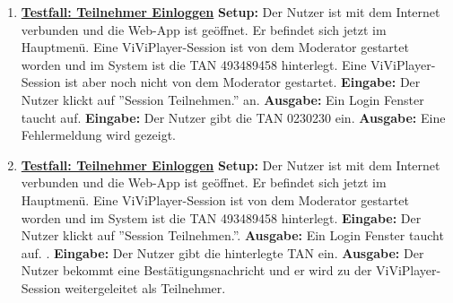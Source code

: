 \begin{enumerate}
	
	\item \underline{\textbf{Testfall: Teilnehmer Einloggen}} \linebreak
	\textbf{Setup:} Der Nutzer ist mit dem Internet verbunden und die Web-App ist geöffnet. Er befindet sich jetzt im Hauptmenü. Eine ViViPlayer-Session ist von dem Moderator gestartet worden und im System ist die TAN 493489458 hinterlegt.
	Eine ViViPlayer-Session ist aber noch nicht von dem Moderator gestartet. \linebreak
	\textbf{Eingabe:} Der Nutzer klickt auf ''Session Teilnehmen.'' an. \linebreak
	\textbf{Ausgabe:} Ein Login Fenster taucht auf.\linebreak
	\textbf{Eingabe:} Der Nutzer gibt die TAN 0230230 ein. \linebreak
	\textbf{Ausgabe:} Eine Fehlermeldung wird gezeigt.
	
	\item \underline{\textbf{Testfall: Teilnehmer Einloggen}} \linebreak
	\textbf{Setup:} Der Nutzer ist mit dem Internet verbunden und die Web-App ist geöffnet. Er befindet sich jetzt im Hauptmenü. Eine ViViPlayer-Session ist von dem Moderator gestartet worden und im System ist die TAN 493489458 hinterlegt. \linebreak
	\textbf{Eingabe:} Der Nutzer klickt auf ''Session Teilnehmen.''. \linebreak
	\textbf{Ausgabe:} Ein Login Fenster taucht auf. .\linebreak
	\textbf{Eingabe:} Der Nutzer gibt die hinterlegte TAN ein. \linebreak
	\textbf{Ausgabe:} Der Nutzer bekommt eine Bestätigungsnachricht und er wird zu der ViViPlayer-Session weitergeleitet als Teilnehmer.
	

\end{enumerate}
